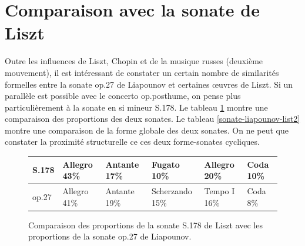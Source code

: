 \section{Comparaison avec la sonate de Liszt}

Outre les influences de Liszt, Chopin et de la musique russes (deuxième mouvement), il est intéressant de constater un certain nombre de similarités formelles entre la sonate op.27 de Liapounov et certaines œuvres de Liszt. Si un parallèle est possible avec le concerto op.posthume, on pense plus particulièrement à la sonate en si mineur S.178. Le tableau \ref{sonate-liapounov-list1} montre une comparaison des proportions des deux sonates. Le tableau \ref{sonate-liapounov-list2} montre une comparaison de la forme globale des deux sonates. On ne peut que constater la proximité structurelle ce ces deux forme-sonates cycliques.

\begin{figure}[!ht]
  \begin{bigcenter}
    \scalebox{0.925} {
\begin{tabular}{|l||l|l|l|l|l|}
 \hline
S.178 & Allegro 43\% & Antante 17\% & Fugato 10\% & Allegro 20\% & Coda 10\%\\
 \hline
 \hline
op.27 & Allegro 41\% & Antante 19\% & Scherzando 15\% & Tempo I 16\% & Coda 8\%\\
 \hline
\end{tabular}
    }
  \end{bigcenter}
  \caption{\label{sonate-liapounov-list1} Comparaison des proportions de la sonate S.178 de Liszt avec les proportions de la sonate op.27 de Liapounov.}
\end{figure}

